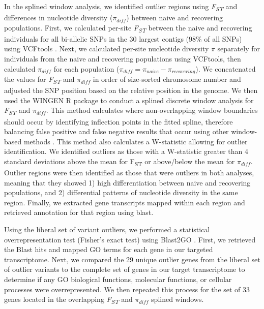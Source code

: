 \documentclass[9pt,twocolumn,twoside,lineno]{pnas-new}
\begin{document}
{In the splined window analysis, we identified outlier regions using
\emph{F\textsubscript{ST}} and differences in nucleotide diversity
(\(\pi_{diff}\)) between naive and recovering populations. First, we
calculated per-site \emph{F\textsubscript{ST}} between the naive and
recovering individuals for all bi-allelic SNPs in the 30 largest contigs
(98\% of all SNPs) using VCFtools \citep{danecek2011}. Next, we
calculated per-site nucleotide diversity \(\pi\) separately for
individuals from the naive and recovering populations using VCFtools,
then calculated \(\pi_{diff}\) for each population
(\(\pi_{diff} = \pi_{naive} - \pi_{recovering}\)). We concatenated the
values for \emph{F\textsubscript{ST}} and \(\pi_{diff}\) in order of
size-sorted chromosome number and adjusted the SNP position based on the
relative position in the genome. We then used the WINGEN R package
\citep{bishop2023} to conduct a splined discrete window analysis for
\emph{F\textsubscript{ST}} and \(\pi_{diff}\). This method calculates
where non-overlapping window boundaries should occur by identifying
inflection points in the fitted spline, therefore balancing false
positive and false negative results that occur using other window-based
methods \citep{beissinger2015} . This method also calculates a
W-statistic allowing for outlier identification. We identified outliers
as those with a W-statistic greater than 4 standard deviations above the
mean for F\textsubscript{ST} or above/below the mean for \(\pi_{diff}\).
Outlier regions were then identified as those that were outliers in both
analyses, meaning that they showed 1) high differentiation between naive
and recovering populations, and 2) differential patterns of nucleotide
diversity in the same region. Finally, we extracted gene transcripts
mapped within each region and retrieved annotation for that region using
blast.

Using the liberal set of variant outliers, we performed a statistical
overrepresentation test (Fisher's exact test) using Blast2GO
\citep{conesa2005}. First, we retrieved the Blast hits and mapped GO
terms for each gene in our targeted transcriptome. Next, we compared the
29 unique outlier genes from the liberal set of outlier variants to the
complete set of genes in our target transcriptome to determine if any GO
biological functions, molecular functions, or cellular processes were
overrepresented. We then repeated this process for the set of 33 genes
located in the overlapping \emph{F\textsubscript{ST}} and \(\pi_{diff}\)
splined windows.

\hypertarget{frog-population-recovery-1}{%
}}
\end{document}
